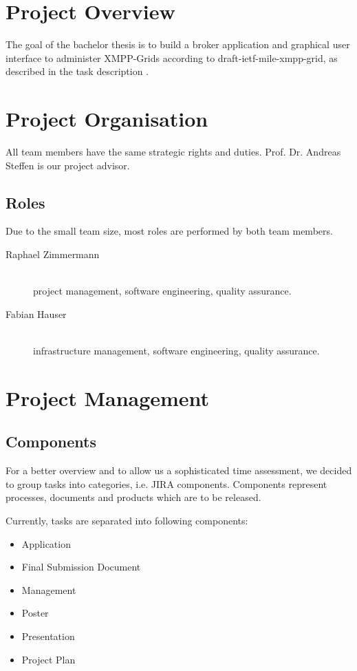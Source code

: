 \tableofcontents %


\mainmatter
\chapter{Project Overview}
The goal of the bachelor thesis is to build a broker application and graphical user interface to administer XMPP-Grids according to draft-ietf-mile-xmpp-grid, as described in the task description \cite{task-description}.


\chapter{Project Organisation}
All team members have the same strategic rights and duties. Prof. Dr. Andreas Steffen is our project advisor.

\section{Roles}
Due to the small team size, most roles are performed by both team members.

\begin{description}
    \item[Raphael Zimmermann] \hfill \\
        project management, software engineering, quality assurance.
    \item[Fabian Hauser] \hfill \\
        infrastructure management, software engineering, quality assurance.
\end{description}

\chapter{Project Management}
\section{Components}
For a better overview and to allow us a sophisticated time assessment, we decided to group tasks into categories, i.e. JIRA components. Components represent processes, documents and products which are to be released.

Currently, tasks are separated into following components:

\begin{multicols}{2}
    \begin{itemize}
        \item Application
        \item Final Submission Document
        \item Management
        \item Poster
        \item Presentation
        \item Project Plan
    \end{itemize}
\end{multicols}

